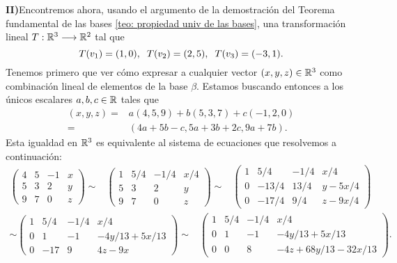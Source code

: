 \textbf{II)}Encontremos ahora, usando el argumento de la demostración
del Teorema fundamental de las bases
\ref{teo: propiedad univ de las bases}, una transformación
lineal $T: \mathbb{R}^{3} \longrightarrow \mathbb{R}^{2}$ tal que 
\begin{equation}
	\label{eq: condiciones para T ejemplo}
	T(v_{1}) = (1, 0), \hspace{0.2cm}
	T(v_{2}) = (2, 5), \hspace{0.2cm}
	T(v_{3}) = (-3, 1).
\end{equation}
Tenemos primero que ver cómo expresar a cualquier vector
$(x, y, z) \in \mathbb{R}^{3}$ como combinación lineal de elementos
de la base $\beta$. Estamos buscando entonces a los únicos
escalares $a, b, c \in \mathbb{R}$ tales que 
\begin{align*}
(x, y, z) = & a (4, 5, 9) + b (5, 3, 7) + c(-1, 2, 0) \\
= & (4a+5b-c, 5a+3b+2c, 9a+7b).
\end{align*}
Esta igualdad en $\mathbb{R}^{3}$ es equivalente al sistema de ecuaciones
que resolvemos a continuación:
\begin{align*}
\left( \begin{array}{rrr|r} 
4 & 5 & -1 & x  \\ 
5 & 3 & 2 & y  \\ 
9 & 7 & 0 & z
\end{array} \right) \sim &
\left( \begin{array}{rrr|r} 
1 & 5/4 & -1/4 & x/4  \\ 
5 & 3 & 2 & y  \\ 
9 & 7 & 0 & z
\end{array} \right) \sim &
\left( \begin{array}{rrr|r} 
1 & 5/4 & -1/4 & x/4  \\ 
0 & -13/4 & 13/4 & y - 5x/4  \\ 
0 & -17/4 & 9/4 & z-9x/4
\end{array} \right) 
\end{align*}
\begin{align*}
\sim
\left( \begin{array}{rrr|r} 
1 & 5/4 & -1/4 & x/4  \\ 
0 & 1 & -1 & -4y/13 + 5x/13  \\ 
0 & -17 & 9 & 4z-9x
\end{array} \right) \sim &
\left( \begin{array}{rrr|r} 
1 & 5/4 & -1/4 & x/4  \\ 
0 & 1 & -1 & -4y/13 + 5x/13  \\ 
0 & 0 & 8 & -4z+68y/13 - 32x/13
\end{array} \right) .
\end{align*}
